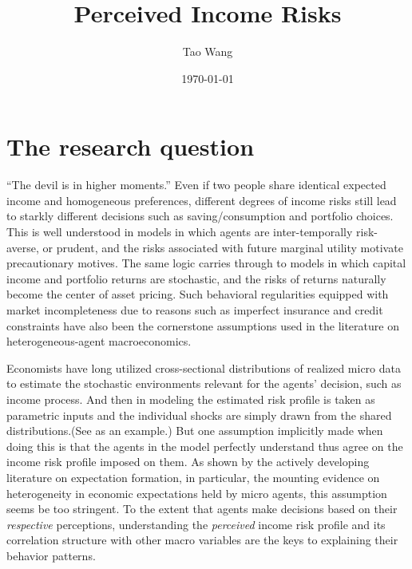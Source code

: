 \documentclass[12pt,notitlepage,onecolumn,aps,pra]{revtex4-1}
\begin{document}
    
    
    \title{Perceived Income Risks}\author{Tao Wang}

\date{\today}
\maketitle


    
    

    
    \hypertarget{the-research-question}{%
\section{The research question}\label{the-research-question}}

``The devil is in higher moments.'' Even if two people share identical
expected income and homogeneous preferences, different degrees of income
risks still lead to starkly different decisions such as
saving/consumption and portfolio choices. This is well understood in
models in which agents are inter-temporally risk-averse, or prudent, and
the risks associated with future marginal utility motivate precautionary
motives. The same logic carries through to models in which capital
income and portfolio returns are stochastic, and the risks of returns
naturally become the center of asset pricing. Such behavioral
regularities equipped with market incompleteness due to reasons such as
imperfect insurance and credit constraints have also been the
cornerstone assumptions used in the literature on heterogeneous-agent
macroeconomics.

Economists have long utilized cross-sectional distributions of realized
micro data to estimate the stochastic environments relevant for the
agents' decision, such as income process. And then in modeling the
estimated risk profile is taken as parametric inputs and the individual
shocks are simply drawn from the shared distributions.(See
\cite{blundell_consumption_2008} as an example.) But one assumption
implicitly made when doing this is that the agents in the model
perfectly understand thus agree on the income risk profile imposed on
them. As shown by the actively developing literature on expectation
formation, in particular, the mounting evidence on heterogeneity in
economic expectations held by micro agents, this assumption seems be too
stringent. To the extent that agents make decisions based on their
\emph{respective} perceptions, understanding the \emph{perceived} income
risk profile and its correlation structure with other macro variables
are the keys to explaining their behavior patterns.
\end{document}
